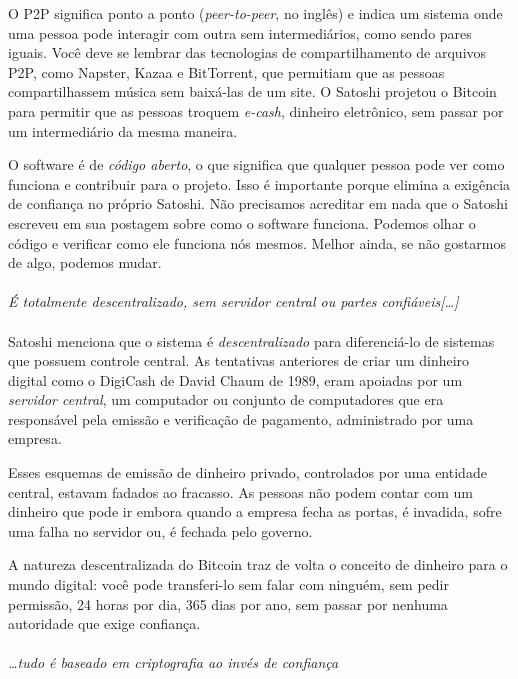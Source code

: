 O P2P significa ponto a ponto (\textit{peer-to-peer}, no inglês) e indica um sistema onde uma pessoa pode interagir com outra sem intermediários, como sendo pares iguais. Você deve se lembrar das tecnologias de compartilhamento de arquivos P2P, como Napster, Kazaa e BitTorrent, que permitiam que as pessoas compartilhassem música sem baixá-las de um site. O Satoshi projetou o Bitcoin para permitir que as pessoas troquem \textit{e-cash}, dinheiro eletrônico, sem passar por um intermediário da mesma maneira.

O software é de \textit{código aberto}, o que significa que qualquer pessoa pode ver como funciona e contribuir para o projeto. Isso é importante porque elimina a exigência de confiança no próprio Satoshi. Não precisamos acreditar em nada que o Satoshi escreveu em sua postagem sobre como o software funciona. Podemos olhar o código e verificar como ele funciona nós mesmos. Melhor ainda, se não gostarmos de algo, podemos mudar.
\paragraph{}
\textit{É totalmente descentralizado, sem servidor central ou partes confiáveis[\ldots]}
\paragraph{}
Satoshi menciona que o sistema é \textit{descentralizado} para diferenciá-lo de sistemas que possuem controle central. As tentativas anteriores de criar um dinheiro digital como o DigiCash de David Chaum de 1989, eram apoiadas por um \textit{servidor central}, um computador ou conjunto de computadores que era responsável pela emissão e verificação de pagamento, administrado por uma empresa.

Esses esquemas de emissão de dinheiro privado, controlados por uma entidade central, estavam fadados ao fracasso. As pessoas não podem contar com um dinheiro que pode ir embora quando a empresa fecha as portas, é invadida, sofre uma falha no servidor ou, é fechada pelo governo.

A natureza descentralizada do Bitcoin traz de volta o conceito de dinheiro para o mundo digital: você pode transferi-lo sem falar com ninguém, sem pedir permissão, 24 horas por dia, 365 dias por ano, sem passar por nenhuma autoridade que exige confiança.
\paragraph{}
\textit{\dots tudo é baseado em criptografia ao invés de confiança}
